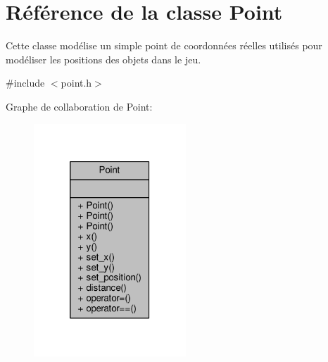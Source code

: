 \hypertarget{classPoint}{\section{Référence de la classe Point}
\label{classPoint}
}


Cette classe modélise un simple point de coordonnées réelles utilisés pour modéliser les positions des objets dans le jeu.  




{\ttfamily \#include $<$point.\+h$>$}



Graphe de collaboration de Point\+:\nopagebreak
\begin{figure}[H]
\begin{center}
\leavevmode
\includegraphics[width=162pt]{d5/d3b/classPoint__coll__graph}
\end{center}
\end{figure}
